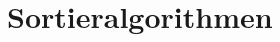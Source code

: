 \documentclass{lehramt-informatik-haupt}
\begin{document}

\chapter{Sortieralgorithmen}

\begin{quellen}
\cite{wiki:sortierverfahren}
\end{quellen}

\literatur
\end{document}
